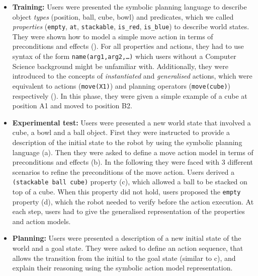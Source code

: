 \begin{itemize}
  \item{\textbf{Training:} Users were presented the symbolic planning language to describe object \textit{types} (\ie position, ball, cube, bowl) and predicates, which we called \textit{properties} (\ie \texttt{empty}, \texttt{at}, \texttt{stackable}, \texttt{is\_red}, \texttt{is\_blue}) to describe world states.
They were shown how to model a simple move action in terms of preconditions and effects ().
For all properties and actions, they had to use syntax of the form \texttt{name(arg1,arg2,\dots)} which users without a  Computer Science background might be unfamiliar with.
Additionally, they were introduced to the concepts of \textit{instantiated} and \textit{generalised} actions, which were equivalent to actions (\eg \texttt{move(X1)}) and planning operators (\eg \texttt{move(cube)}) respectively ().
In this phase, they were given a simple example of a cube at position A1 and moved to position B2.}
  \item{\textbf{Experimental test:} Users were presented a new world state that involved a cube, a bowl and a ball object. 
  	First they were instructed to provide a description of the initial state to the robot by using the symbolic planning language (a).
Then they were asked to define a move action model in terms of preconditions and effects (b).
In the following they were faced with 3 different scenarios to refine the preconditions of the move action.
Users derived a \texttt{(stackable ball cube)} property (c), which allowed a ball to be stacked on top of a cube.
When this property did not hold, users proposed the \texttt{empty} property (d), which the robot needed to verify before the action execution.
At each step, users had to give the generalised representation of the properties and action models.}
  \item{\textbf{Planning:} Users were presented a description of a new initial state of the world and a goal state.
They were asked to define an action sequence, that allows the transition from the initial to the goal state (similar to c), and explain their reasoning using the symbolic action model representation.
}
\end{itemize}
